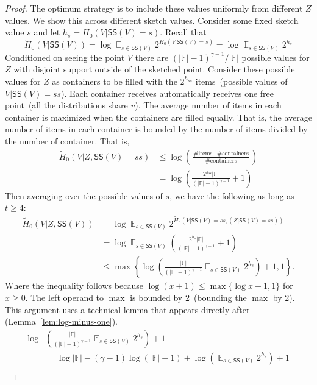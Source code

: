 \documentclass[11pt]{article}
\newcommand{\lemref}[1]{\mbox{Lemma~\ref{#1}}}
\DeclareMathOperator*{\expe}{\mathbb{E}}
\newcommand{\class}[1]{{\ensuremath{\mathsf{#1}}}}
\newcommand{\sketch}{\ensuremath{\class{SS}}\xspace}
\begin{document}
\begin{proof}
The optimum strategy is to include these values uniformly from different $Z$ values.
We show this across different sketch values.  Consider some fixed sketch value $s$ and let $h_s= H_0(V | \sketch(V) = s)$.  %
Recall that 
\[
\tilde{H}_0(V | \sketch(V)) =  \log \expe_{s\in \sketch(V)} 2^{H_0(V | \sketch(V) = s)}  = \log \expe_{s\in \sketch(V)} 2^{h_s} %
\]  
Conditioned on seeing the point $V$ there are $(|\mathbb{F}|-1)^{\gamma-1}/|\mathbb{F}|$ possible values for $Z$ with disjoint support outside of the sketched point.  Consider these possible values for $Z$ as containers to be filled with the $2^{h_{ss}}$ items~(possible values of $V | \sketch(V)=ss$).  Each container receives automatically receives one free point~(all the distributions share $v$).  The average number of items in each container is maximized when the containers are filled equally.  That is, the average number of items in each container is bounded by the number of items divided by the number of container.  That is, 
\begin{align*}
\tilde{H}_0(V |Z  , \sketch(V) = ss) &\le \log \left(\frac{\text{\# items}+\text{\# containers}}{\text{\# containers}}\right)\\
&= \log \left(\frac{2^{h_{ss}}|\mathbb{F}|}{(|\mathbb{F}|-1)^{\gamma-1}} +1 \right)
\end{align*}
Then averaging over the possible values of $s$, we have the following as long as $t\ge 4$:
\begin{align*}
\tilde{H}_0(V |Z , \sketch(V) ) &= \log \expe_{s\in \sketch(V)} 2^{\tilde{H}_0(V |  \sketch(V) =ss , (Z| \sketch(V) =ss) )}\\
&= \log\expe_{s\in \sketch(V)} \left(\frac{2^{h_s}|\mathbb{F}|}{(|\mathbb{F}|-1)^{\gamma-1}} +1\right)\\
&\le \max\left\{ \log \left(\frac{|\mathbb{F}|}{(|\mathbb{F}|-1)^{\gamma-1}} \expe_{s\in \sketch(V)} 2^{h_s}\right)+1, 1\right\}.
\end{align*}
Where the inequality follows because $\log (x+1) \le \max\{ \log x+ 1,1\}$ for $x\ge 0$.
The left operand to $\max$ is bounded by $2$~(bounding the $\max$ by $2$).  This argument uses a technical lemma that appears directly after (\lemref{lem:log-minus-one}).
\begin{align*}
\log &\left(\frac{|\mathbb{F}|}{(|\mathbb{F}|-1)^{\gamma-1}} \expe_{s\in \sketch(V)} 2^{h_s}\right)+1\\
&=\log |\mathbb{F}| - (\gamma -1)\log (|\mathbb{F}|-1) + \log \left(\expe_{s\in \sketch(V)} 2^{h_s}\right) +1\\

\end{align*}
\end{proof}
\end{document}
